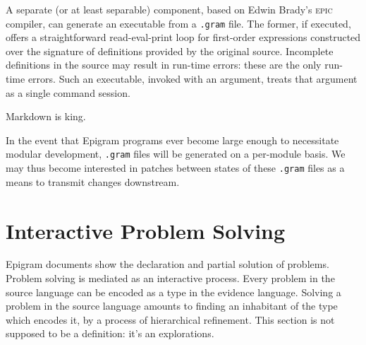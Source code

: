 \documentclass{article}
\begin{document}
A separate (or at least separable) component, based on Edwin Brady's
\textsc{epic} compiler, can generate an executable from a \texttt{.gram}
file. The former, if executed, offers a straightforward
read-eval-print loop for first-order expressions constructed over the
signature of definitions provided by the original source. Incomplete
definitions in the source may result in run-time errors: these are the
only run-time errors.  Such an executable, invoked with an argument,
treats that argument as a single command session.

Markdown is king.

In the event that Epigram programs ever become large enough to
necessitate modular development, \texttt{.gram} files will be generated
on a per-module basis. We may thus become interested in patches
between states of these \texttt{.gram} files as a means to transmit
changes downstream.


\section{Interactive Problem Solving}

Epigram documents show the declaration and partial solution of problems.
Problem solving is mediated as an interactive process. Every problem
in the source language can be encoded as a type in the evidence
language. Solving a problem in the source language amounts to finding
an inhabitant of the type which encodes it, by a process of
hierarchical refinement. This section is not supposed to be a definition:
it's an explorations.
\end{document}
